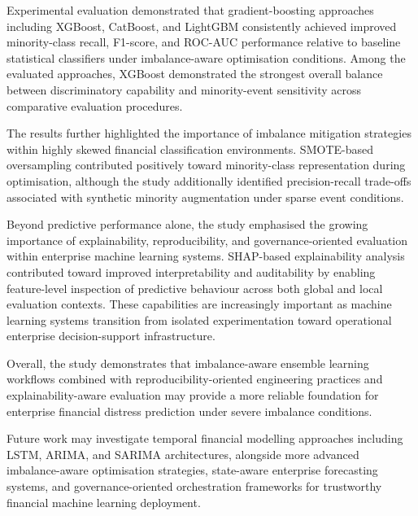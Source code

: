 \documentclass{article}
\begin{document}
Experimental evaluation demonstrated that gradient-boosting approaches including XGBoost, CatBoost, and LightGBM consistently achieved improved minority-class recall, F1-score, and ROC-AUC performance relative to baseline statistical classifiers under imbalance-aware optimisation conditions. Among the evaluated approaches, XGBoost demonstrated the strongest overall balance between discriminatory capability and minority-event sensitivity across comparative evaluation procedures.

The results further highlighted the importance of imbalance mitigation strategies within highly skewed financial classification environments. SMOTE-based oversampling contributed positively toward minority-class representation during optimisation, although the study additionally identified precision-recall trade-offs associated with synthetic minority augmentation under sparse event conditions.

Beyond predictive performance alone, the study emphasised the growing importance of explainability, reproducibility, and governance-oriented evaluation within enterprise machine learning systems. SHAP-based explainability analysis contributed toward improved interpretability and auditability by enabling feature-level inspection of predictive behaviour across both global and local evaluation contexts. These capabilities are increasingly important as machine learning systems transition from isolated experimentation toward operational enterprise decision-support infrastructure.

Overall, the study demonstrates that imbalance-aware ensemble learning workflows combined with reproducibility-oriented engineering practices and explainability-aware evaluation may provide a more reliable foundation for enterprise financial distress prediction under severe imbalance conditions.

Future work may investigate temporal financial modelling approaches including LSTM, ARIMA, and SARIMA architectures, alongside more advanced imbalance-aware optimisation strategies, state-aware enterprise forecasting systems, and governance-oriented orchestration frameworks for trustworthy financial machine learning deployment.


\end{document}
